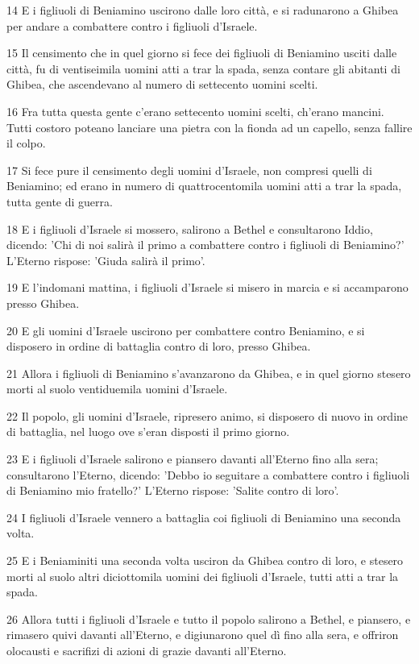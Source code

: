 \par 14 E i figliuoli di Beniamino uscirono dalle loro città, e si radunarono a Ghibea per andare a combattere contro i figliuoli d'Israele.
\par 15 Il censimento che in quel giorno si fece dei figliuoli di Beniamino usciti dalle città, fu di ventiseimila uomini atti a trar la spada, senza contare gli abitanti di Ghibea, che ascendevano al numero di settecento uomini scelti.
\par 16 Fra tutta questa gente c'erano settecento uomini scelti, ch'erano mancini. Tutti costoro poteano lanciare una pietra con la fionda ad un capello, senza fallire il colpo.
\par 17 Si fece pure il censimento degli uomini d'Israele, non compresi quelli di Beniamino; ed erano in numero di quattrocentomila uomini atti a trar la spada, tutta gente di guerra.
\par 18 E i figliuoli d'Israele si mossero, salirono a Bethel e consultarono Iddio, dicendo: 'Chi di noi salirà il primo a combattere contro i figliuoli di Beniamino?' L'Eterno rispose: 'Giuda salirà il primo'.
\par 19 E l'indomani mattina, i figliuoli d'Israele si misero in marcia e si accamparono presso Ghibea.
\par 20 E gli uomini d'Israele uscirono per combattere contro Beniamino, e si disposero in ordine di battaglia contro di loro, presso Ghibea.
\par 21 Allora i figliuoli di Beniamino s'avanzarono da Ghibea, e in quel giorno stesero morti al suolo ventiduemila uomini d'Israele.
\par 22 Il popolo, gli uomini d'Israele, ripresero animo, si disposero di nuovo in ordine di battaglia, nel luogo ove s'eran disposti il primo giorno.
\par 23 E i figliuoli d'Israele salirono e piansero davanti all'Eterno fino alla sera; consultarono l'Eterno, dicendo: 'Debbo io seguitare a combattere contro i figliuoli di Beniamino mio fratello?' L'Eterno rispose: 'Salite contro di loro'.
\par 24 I figliuoli d'Israele vennero a battaglia coi figliuoli di Beniamino una seconda volta.
\par 25 E i Beniaminiti una seconda volta usciron da Ghibea contro di loro, e stesero morti al suolo altri diciottomila uomini dei figliuoli d'Israele, tutti atti a trar la spada.
\par 26 Allora tutti i figliuoli d'Israele e tutto il popolo salirono a Bethel, e piansero, e rimasero quivi davanti all'Eterno, e digiunarono quel dì fino alla sera, e offriron olocausti e sacrifizi di azioni di grazie davanti all'Eterno.
